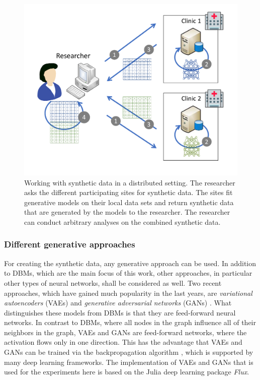 \documentclass[12pt]{article}
\newcommand{\apkg}[1]{\emph{#1}}
\newcommand{\circlenum}[1]{\raisebox{.5pt}{\textcircled{\raisebox{-.9pt} {#1}}}}
\begin{document}
\begin{figure}[h]
   \centering
   \includegraphics[scale=0.7]{images/synthetic_data_principle.pdf}
   \caption{Working with synthetic data in a distributed setting. \circlenum{1}The researcher asks the different participating sites for synthetic data. \circlenum{2}The sites fit generative models on their local data sets and \circlenum{3} return synthetic data that are generated by the models to the researcher. \circlenum{4}The researcher can conduct arbitrary analyses on the combined synthetic data.}
   \label{fig:syntheticdataprinciple}
 \end{figure}

\subsubsection{Different generative approaches}\label{diffgenmodels}

For creating the synthetic data, any generative approach can be used.
In addition to DBMs, which are the main focus of this work, other approaches, in particular other types of neural networks, shall be considered as well.
Two recent approaches, which have gained much popularity in the last years, are {\em variational autoencoders} (VAEs) \citep{Kingma2013} and {\em generative adversarial networks} (GANs) \citep{goodfellow_generative_2014}.
What distinguishes these models from DBMs is that they are feed-forward neural networks.
In contrast to DBMs, where all nodes in the graph influence all of their neighbors in the graph, VAEs and GANs are feed-forward networks, where the activation flows only in one direction.
This has the advantage that VAEs and GANs can be trained via the backpropagation algorithm \citep{backpropagation}, which is supported by many deep learning frameworks.
The implementation of VAEs and GANs that is used for the experiments here is based on the Julia deep learning package \apkg{Flux}.
 
\end{document}
